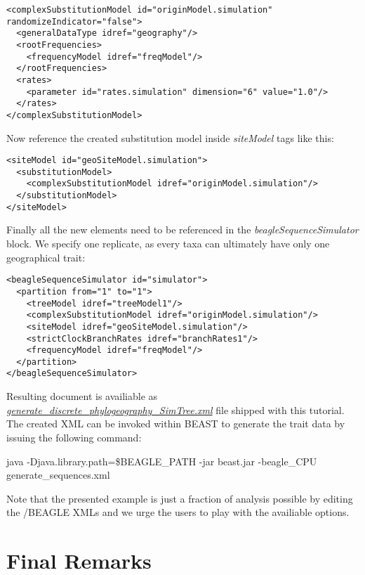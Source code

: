 \begin{lstlisting}
<complexSubstitutionModel id="originModel.simulation" randomizeIndicator="false">
  <generalDataType idref="geography"/>
  <rootFrequencies>
    <frequencyModel idref="freqModel"/>
  </rootFrequencies>
  <rates>
    <parameter id="rates.simulation" dimension="6" value="1.0"/>
  </rates>
</complexSubstitutionModel>
\end{lstlisting}

Now reference the created substitution model inside \emph{siteModel} tags like this:

\begin{lstlisting}
<siteModel id="geoSiteModel.simulation">
  <substitutionModel>
    <complexSubstitutionModel idref="originModel.simulation"/>
  </substitutionModel>
</siteModel>
\end{lstlisting}

Finally all the new elements need to be referenced in the \emph{beagleSequenceSimulator} block. We specify one replicate, as every taxa can ultimately have only one geographical trait:
\begin{lstlisting}
<beagleSequenceSimulator id="simulator">
  <partition from="1" to="1"> 
    <treeModel idref="treeModel1"/>
    <complexSubstitutionModel idref="originModel.simulation"/>	    
    <siteModel idref="geoSiteModel.simulation"/>
    <strictClockBranchRates idref="branchRates1"/>
    <frequencyModel idref="freqModel"/>
  </partition>
</beagleSequenceSimulator>
\end{lstlisting}

Resulting document is availiable as \href{http://rega.kuleuven.be/cev/ecv/software/buss_files/generate\_discrete\_phylogeography\_SimTree.xml}{\emph{generate\_discrete\_phylogeography\_SimTree.xml}} file shipped with this tutorial.
The created XML can be invoked within BEAST to generate the trait data by issuing the following command:

\begin{code}
java -Djava.library.path=\$BEAGLE\_PATH -jar beast.jar -beagle\_CPU generate\_sequences.xml
\end{code}

Note that the presented example is just a fraction of analysis possible by editing the \bussname/BEAGLE XMLs and we urge the users to play with the availiable options. 

\section{Final Remarks}

